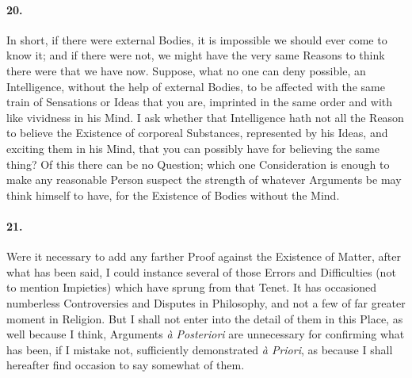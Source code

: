\documentclass[]{article}
\newenvironment{sectionbody}{}{}
\begin{document}
\begin{sectionbody}
\paragraph{20.} In short, if there were external Bodies, it is impossible we
should ever come to know it; and if there were not, we might have
the very same Reasons to think there were that we have now.
Suppose, what no one can deny possible, an Intelligence, without
the help of external Bodies, to be affected with the same train
of Sensations or Ideas that you are, imprinted in the same order
and with like vividness in his Mind.  I ask whether that
Intelligence hath not all the Reason to believe the Existence of
corporeal Substances, represented by his Ideas, and exciting them
in his Mind, that you can possibly have for believing the same
thing? Of this there can be no Question; which one Consideration
is enough to make any reasonable Person suspect the strength of
whatever Arguments be may think himself to have, for the
Existence of Bodies without the Mind.



\paragraph{21.} Were it necessary to add any farther Proof against the Existence
of Matter, after what has been said, I could instance several of
those Errors and Difficulties (not to mention Impieties) which
have sprung from that Tenet.  It has occasioned numberless
Controversies and Disputes in Philosophy, and not a few of far
greater moment in Religion.  But I shall not enter into the
detail of them in this Place, as well because I think, Arguments
\emph{\`{a} Posteriori} are unnecessary for confirming what
has been, if I mistake not, sufficiently demonstrated
\emph{\`{a} Priori}, as because I shall hereafter find
occasion to say somewhat of them.




\end{sectionbody}
\end{document}
